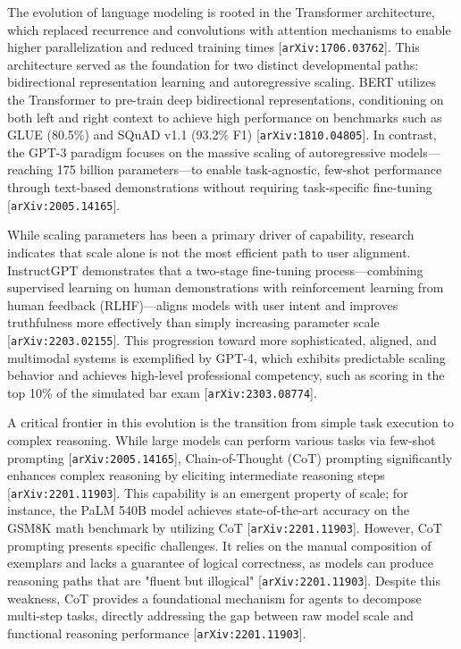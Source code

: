 \documentclass[11pt]{article}
\begin{document}
The evolution of language modeling is rooted in the Transformer architecture, which replaced recurrence and convolutions with attention mechanisms to enable higher parallelization and reduced training times [\texttt{arXiv:1706.03762}]. This architecture served as the foundation for two distinct developmental paths: bidirectional representation learning and autoregressive scaling. BERT utilizes the Transformer to pre-train deep bidirectional representations, conditioning on both left and right context to achieve high performance on benchmarks such as GLUE (80.5\%) and SQuAD v1.1 (93.2\% F1) [\texttt{arXiv:1810.04805}]. In contrast, the GPT-3 paradigm focuses on the massive scaling of autoregressive models—reaching 175 billion parameters—to enable task-agnostic, few-shot performance through text-based demonstrations without requiring task-specific fine-tuning [\texttt{arXiv:2005.14165}].

While scaling parameters has been a primary driver of capability, research indicates that scale alone is not the most efficient path to user alignment. InstructGPT demonstrates that a two-stage fine-tuning process—combining supervised learning on human demonstrations with reinforcement learning from human feedback (RLHF)—aligns models with user intent and improves truthfulness more effectively than simply increasing parameter scale [\texttt{arXiv:2203.02155}]. This progression toward more sophisticated, aligned, and multimodal systems is exemplified by GPT-4, which exhibits predictable scaling behavior and achieves high-level professional competency, such as scoring in the top 10\% of the simulated bar exam [\texttt{arXiv:2303.08774}].

A critical frontier in this evolution is the transition from simple task execution to complex reasoning. While large models can perform various tasks via few-shot prompting [\texttt{arXiv:2005.14165}], Chain-of-Thought (CoT) prompting significantly enhances complex reasoning by eliciting intermediate reasoning steps [\texttt{arXiv:2201.11903}]. This capability is an emergent property of scale; for instance, the PaLM 540B model achieves state-of-the-art accuracy on the GSM8K math benchmark by utilizing CoT [\texttt{arXiv:2201.11903}]. However, CoT prompting presents specific challenges. It relies on the manual composition of exemplars and lacks a guarantee of logical correctness, as models can produce reasoning paths that are "fluent but illogical" [\texttt{arXiv:2201.11903}]. Despite this weakness, CoT provides a foundational mechanism for agents to decompose multi-step tasks, directly addressing the gap between raw model scale and functional reasoning performance [\texttt{arXiv:2201.11903}].
\end{document}
